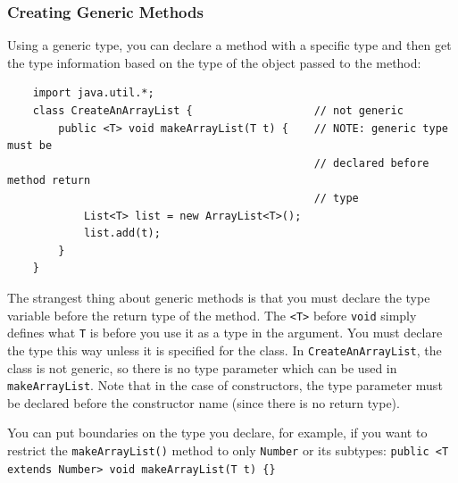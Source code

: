 \subsubsection{Creating Generic Methods}
Using a generic type, you can declare a method with a specific type and then 
get the type information based on the type of the object passed to the method:
\begin{verbatim}
    import java.util.*;
    class CreateAnArrayList {                   // not generic
        public <T> void makeArrayList(T t) {    // NOTE: generic type must be 
                                                // declared before method return
                                                // type
            List<T> list = new ArrayList<T>();
            list.add(t);
        }
    }
\end{verbatim}

The strangest thing about generic methods is that you must declare the type 
variable before the return type of the method. The \verb#<T># before 
\verb#void# simply defines what \verb#T# is before you use it as a type in the 
argument. You must declare the type this way unless it is specified for the 
class. In \verb#CreateAnArrayList#, the class is not generic, so there is no 
type parameter which can be used in \verb#makeArrayList#. Note that in the case 
of constructors, the type parameter must be declared before the constructor 
name (since there is no return type).

You can put boundaries on the type you declare, for example, if you want to 
restrict the \verb#makeArrayList()# method to only \verb#Number# or its 
subtypes: \verb#public <T extends Number> void makeArrayList(T t) {}#
